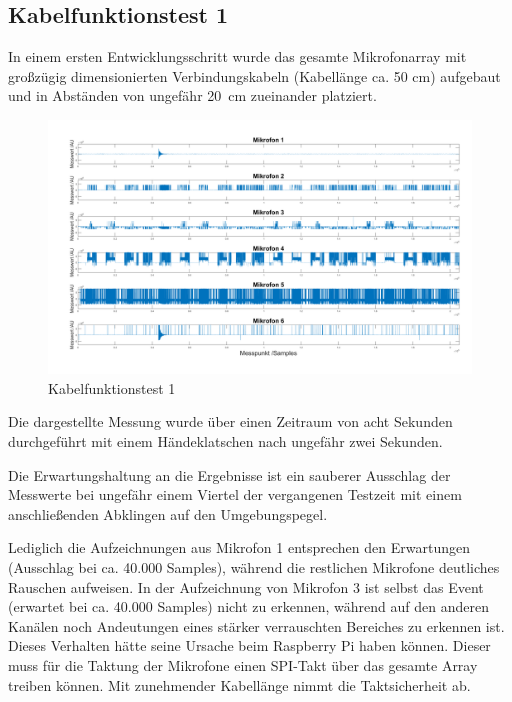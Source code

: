 \subsection{Kabelfunktionstest 1}

In einem ersten Entwicklungsschritt wurde das gesamte Mikrofonarray mit großzügig dimensionierten Verbindungskabeln (Kabellänge ca. 50 cm) aufgebaut und in Abständen von ungefähr \SI{20}{cm} zueinander platziert. 

\begin{figure}[!h]
	\begin{center}
		\includegraphics[scale=0.2]{Sections/Tests/Test_1_d}
	\end{center}
	\caption{Kabelfunktionstest 1}
	\label{fig:Test_1_d}
\end{figure}

Die dargestellte Messung wurde über einen Zeitraum von acht Sekunden durchgeführt mit einem Händeklatschen nach ungefähr zwei Sekunden.

Die Erwartungshaltung an die Ergebnisse ist ein sauberer Ausschlag der Messwerte bei ungefähr einem Viertel der vergangenen Testzeit mit einem anschließenden Abklingen auf den Umgebungspegel.

Lediglich die Aufzeichnungen aus Mikrofon 1 entsprechen den Erwartungen (Ausschlag bei ca. 40.000 Samples), während die restlichen Mikrofone deutliches Rauschen aufweisen. In der Aufzeichnung von Mikrofon 3 ist selbst das Event (erwartet bei ca. 40.000 Samples) nicht zu erkennen, während auf den anderen Kanälen noch Andeutungen eines stärker verrauschten Bereiches zu erkennen ist. Dieses Verhalten hätte seine Ursache beim Raspberry Pi haben können. Dieser muss für die Taktung der Mikrofone einen SPI-Takt über das gesamte Array treiben können. Mit zunehmender Kabellänge nimmt die Taktsicherheit ab. 

